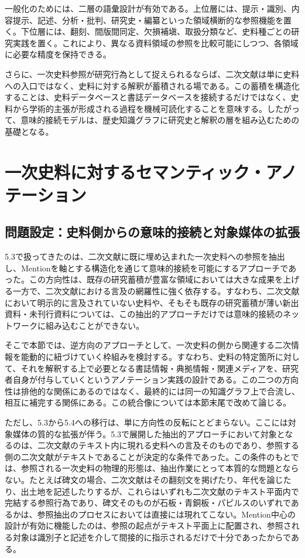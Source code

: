 一般化のためには、二層の語彙設計が有効である。上位層には、提示・識別、内容提示、記述、分析・批判、研究史・編纂といった領域横断的な参照機能を置く。下位層には、翻刻、間版間同定、欠損補塡、取扱分類など、史料種ごとの研究実践を置く。これにより、異なる資料領域の参照を比較可能にしつつ、各領域に必要な精度を保持できる。

さらに、一次史料参照が研究行為として捉えられるならば、二次文献は単に史料への入口ではなく、史料に対する解釈が蓄積される場である。この蓄積を構造化することは、史料データベースと書誌データベースを接続するだけではなく、史料から学術的主張が形成される過程を機械可読化することを意味する。したがって、意味的接続モデルは、歴史知識グラフに研究史と解釈の層を組み込むための基礎となる。

\section{一次史料に対するセマンティック・アノテーション}

\subsection{問題設定：史料側からの意味的接続と対象媒体の拡張}

5.3で扱ってきたのは、二次文献に既に埋め込まれた一次史料への参照を抽出し、Mentionを軸とする構造化を通じて意味的接続を可能にするアプローチであった。この方向性は、既存の研究蓄積が豊富な領域においては大きな成果を上げる一方で、二次文献における言及の網羅性に強く依存する。すなわち、二次文献において明示的に言及されていない史料や、そもそも既存の研究蓄積が薄い新出資料・未刊行資料については、この抽出的アプローチだけでは意味的接続のネットワークに組み込むことができない。

そこで本節では、逆方向のアプローチとして、一次史料の側から関連する二次情報を能動的に紐づけていく枠組みを検討する。すなわち、史料の特定箇所に対して、それを解釈する上で必要となる書誌情報・典拠情報・関連メディアを、研究者自身が付与していくというアノテーション実践の設計である。この二つの方向性は排他的な関係にあるのではなく、最終的には同一の知識グラフ上で合流し、相互に補完する関係にある。この統合像については本節末尾で改めて論じる。

ただし、5.3から5.4への移行は、単に方向性の反転にとどまらない。ここには対象媒体の質的な拡張が伴う。5.3で展開した抽出的アプローチにおいて対象となるのは、二次文献のテキスト内に現れる史料への言及そのものであり、参照する側の二次文献がテキストであることが決定的な条件であった。この条件のもとでは、参照される一次史料の物理的形態は、抽出作業にとって本質的な問題とならない。たとえば碑文の場合、二次文献はその翻刻文を掲げたり、年代を論じたり、出土地を記述したりするが、これらはいずれも二次文献のテキスト平面内で完結する参照行為であり、碑文そのものが石板・青銅板・パピルスのいずれであるかは、参照抽出のプロセスにおいては直接には現れてこない。Mention中心の設計が有効に機能したのは、参照の起点がテキスト平面上に配置され、参照される対象は識別子と記述を介して間接的に指示されるだけで十分であったからである。

